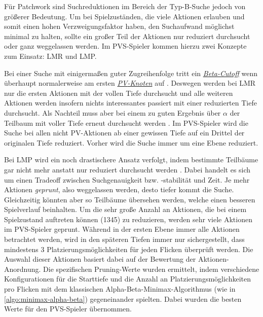 \vspace*{-5cm}

\pagebreak

Für Patchwork sind Suchreduktionen im Bereich der Typ-B-Suche jedoch von größerer Bedeutung. Um bei Spielzuständen, die viele Aktionen erlauben und somit einen hohen Verzweigungsfaktor haben, den Suchaufwand möglichst minimal zu halten, sollte ein großer Teil der Aktionen nur reduziert durchsucht oder ganz weggelassen werden. Im \ac{PVS}-Spieler kommen hierzu zwei Konzepte zum Einsatz: \ac{LMR} und \ac{LMP}.

Bei einer Suche mit einigermaßen guter Zugreihenfolge tritt ein \hyperref[text:beta-cutoff]{\emph{Beta-Cutoff}} wenn überhaupt normalerweise am ersten \hyperref[text:pv-node]{\emph{\acs{PV}-Knoten}} auf \cite{2007.LMR}. Deswegen werden bei \ac{LMR} nur die ersten Aktionen mit der vollen Tiefe durchsucht und alle weiteren Aktionen werden insofern nichts interessantes passiert mit einer reduzierten Tiefe durchsucht. Als Nachteil muss aber bei einem zu guten Ergebnis über $\alpha$ der Teilbaum mit voller Tiefe erneut durchsucht werden \cite{2007.LMR}. Im \ac{PVS}-Spieler wird die Suche bei allen nicht \ac{PV}-Aktionen ab einer gewissen Tiefe auf ein Drittel der originalen Tiefe reduziert. Vorher wird die Suche immer um eine Ebene reduziert.

Bei \ac{LMP} wird ein noch drastischere Ansatz verfolgt, indem bestimmte Teilbäume gar nicht mehr anstatt nur reduziert durchsucht werden \cite{2023.StockfishTerminology}. Dabei handelt es sich um einen Tradeoff zwischen Suchgenauigkeit bzw. -stabilität und Zeit. Je mehr Aktionen \emph{geprunt}, also weggelassen werden, desto tiefer kommt die Suche. Gleichzeitig könnten aber so Teilbäume übersehen werden, welche einen besseren Spielverlauf beinhalten. Um die sehr große Anzahl an Aktionen, die bei einem Spielzustand auftreten können (1345) zu reduzieren, werden sehr viele Aktionen im \ac{PVS}-Spieler geprunt. Während in der ersten Ebene immer alle Aktionen betrachtet werden, wird in den späteren Tiefen immer nur sichergestellt, dass mindestens 3 Platzierungsmöglichkeiten für jeden Flicken überprüft werden. Die Auswahl dieser Aktionen basiert dabei auf der Bewertung der Aktionen-Anordnung. Die spezifischen Pruning-Werte wurden ermittelt, indem verschiedene Konfigurationen für die Starttiefe und die Anzahl an Platzierungsmöglichkeiten pro Flicken mit dem klassischen Alpha-Beta-Minimax-Algorithmus (wie in \ref{algo:minimax-alpha-beta}) gegeneinander spielten. Dabei wurden die besten Werte für den \ac{PVS}-Spieler übernommen.

